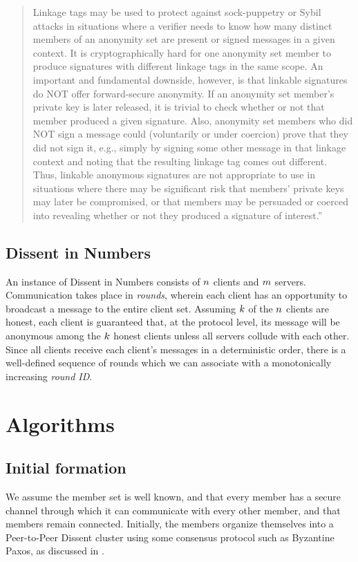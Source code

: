 \begin{quote}
Linkage tags may be used to protect against sock-puppetry or Sybil attacks in
situations where a verifier needs to know how many distinct members of an
anonymity set are present or signed messages in a given context. It is
cryptographically hard for one anonymity set member to produce signatures with
different linkage tags in the same scope. An important and fundamental downside,
however, is that linkable signatures do NOT offer forward-secure anonymity. If
an anonymity set member's private key is later released, it is trivial to check
whether or not that member produced a given signature. Also, anonymity set
members who did NOT sign a message could (voluntarily or under coercion) prove
that they did not sign it, e.g., simply by signing some other message in that
linkage context and noting that the resulting linkage tag comes out different.
Thus, linkable anonymous signatures are not appropriate to use in situations
where there may be significant risk that members' private keys may later be
compromised, or that members may be persuaded or coerced into revealing whether
or not they produced a signature of interest.''
\end{quote}
\cite{golrs}
\subsection{Dissent in Numbers}
An instance of Dissent in Numbers consists of $n$ clients and
$m$ servers.  Communication takes place in \emph{rounds}, wherein each
client has an opportunity to broadcast a message to the entire client set.
Assuming $k$ of the $n$ clients are honest, each client is
guaranteed that, at the protocol level, its message will be anonymous among the
$k$ honest clients unless all servers collude with each
other. Since all clients receive each client's messages in a
deterministic order, there is a well-defined sequence of rounds which we can
associate with a monotonically increasing \emph{round ID}.

\section{Algorithms}
\subsection{Initial formation}
We assume the member set is well known, and that every member has a secure
channel through which it can communicate with every other member, and that
members remain connected. Initially, the
members organize themselves into a Peer-to-Peer Dissent
cluster \cite{p2pd} using some consensus protocol such
as Byzantine Paxos, as discussed in \cite{sec}.

